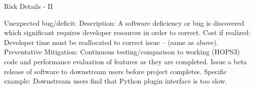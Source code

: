 \documentclass[8pt]{beamer}
\begin{document}
\begin{frame}{Risk Details - II}
    
    \begin{outline}
            \1 Unexpected bug/deficit:
            \2 Description: A software deficiency or bug is discovered which significant requires developer resources in order to correct.
            \2 Cost if realized: Developer time must be reallocated to correct issue -- (same as above).
            \2 Preventative Mitigation: Continuous testing/comparison to working (HOPS3) code and performance evaluation of features as they are completed. Issue a beta release of software to downstream users before project completes. 
            \2 Specific example:
                \3 Downstream users find that Python plugin interface is too slow.
    \end{outline}
    
\end{frame}
\end{document}
